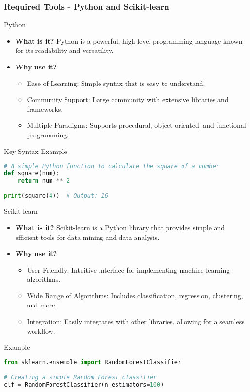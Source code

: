 \documentclass[aspectratio=169]{beamer}
\begin{document}
\begin{frame}[fragile]
    \frametitle{Required Tools - Python and Scikit-learn}
    \begin{block}{Python}
        \begin{itemize}
            \item \textbf{What is it?}
            Python is a powerful, high-level programming language known for its readability and versatility.

            \item \textbf{Why use it?}
            \begin{itemize}
                \item Ease of Learning: Simple syntax that is easy to understand.
                \item Community Support: Large community with extensive libraries and frameworks.
                \item Multiple Paradigms: Supports procedural, object-oriented, and functional programming.
            \end{itemize}
        \end{itemize}
    \end{block}
    \begin{block}{Key Syntax Example}
        \begin{lstlisting}[language=Python]
# A simple Python function to calculate the square of a number
def square(num):
    return num ** 2

print(square(4))  # Output: 16
        \end{lstlisting}
    \end{block}
    \begin{block}{Scikit-learn}
        \begin{itemize}
            \item \textbf{What is it?}
            Scikit-learn is a Python library that provides simple and efficient tools for data mining and data analysis.

            \item \textbf{Why use it?}
            \begin{itemize}
                \item User-Friendly: Intuitive interface for implementing machine learning algorithms.
                \item Wide Range of Algorithms: Includes classification, regression, clustering, and more.
                \item Integration: Easily integrates with other libraries, allowing for a seamless workflow.
            \end{itemize}
        \end{itemize}
        \begin{block}{Example}
            \begin{lstlisting}[language=Python]
from sklearn.ensemble import RandomForestClassifier

# Creating a simple Random Forest classifier
clf = RandomForestClassifier(n_estimators=100)
            \end{lstlisting}
        \end{block}
    \end{block}
\end{frame}
\end{document}
